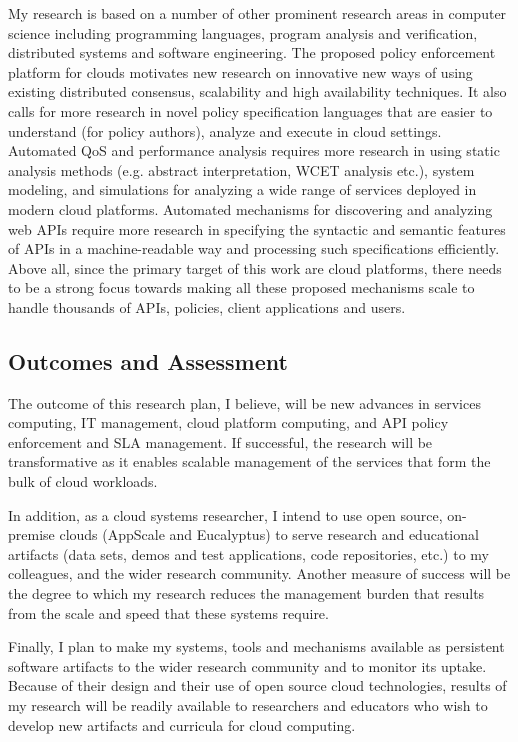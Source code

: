 \documentclass[10pt]{article}
\begin{document}
My research is based on a number of other prominent research areas in computer
science including programming languages, program analysis and verification, 
distributed systems and software engineering. The proposed policy enforcement
platform for clouds motivates new research on innovative new ways of using existing
distributed consensus, scalability and high availability techniques. It also calls for
more research in novel policy specification languages that
are easier to understand (for policy authors), analyze and execute in cloud settings.
Automated QoS and performance analysis requires more research in using
static analysis methods (e.g. abstract interpretation, WCET analysis etc.), system modeling,
and simulations for analyzing a wide range of services deployed in modern cloud platforms.
Automated mechanisms for discovering and analyzing web APIs require more research
in specifying the syntactic and semantic features of APIs in a machine-readable way
and processing such specifications efficiently. Above all, since the primary target of this
work are cloud platforms, there needs to be a strong focus towards making all these 
proposed mechanisms scale to handle thousands of APIs, policies, client applications and users.

\subsection{Outcomes and Assessment}

The outcome of this research plan,
I believe, will be new advances in services computing, IT management, cloud
platform computing, and API policy enforcement and SLA management.
If successful, the research will be transformative as it
enables scalable management of the services that form the
bulk of cloud workloads.

In addition,
as a cloud systems researcher, I intend to use open source, on-premise clouds (AppScale
and Eucalyptus) to serve research and educational artifacts (data sets, demos and test applications, 
code repositories, etc.) to my colleagues, 
and the wider research community.  Another measure of success will
be the degree to which my research reduces the management burden that results from
the scale and speed that these systems require.

Finally, I plan to make my systems, tools and mechanisms available as persistent software artifacts to
the wider research community and to monitor its uptake.  Because of their design
and their use of open source cloud technologies, results of my research will be readily available
to researchers and educators who wish to develop new artifacts and curricula
for cloud computing. 
\end{document}
